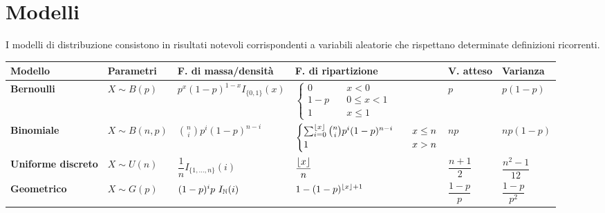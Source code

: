 \section{Modelli}
I modelli di distribuzione consistono in risultati notevoli corrispondenti a variabili aleatorie che rispettano determinate definizioni ricorrenti.

\begin{sidewaystable}
	\centering
	\begin{tabular}{llllll}
		\toprule
		\bfseries Modello           & \bfseries Parametri   & \bfseries F. di massa/densità                                    & \bfseries F. di ripartizione                                                                                          & \bfseries V. atteso & \bfseries Varianza    \\
		\midrule
		\bfseries Bernoulli         & $X\sim B(p)$          & $p^x(1-p)^{1-x}I_{\{0,1\}}(x)$                                   & $\begin{cases}0\quad & x<0\\1-p\quad & 0\leq x<1\\1\quad & x\leq 1\end{cases}$                                                                                           & $p$                 & $p(1-p)$              \\[5ex]
		\bfseries Binomiale         & $X\sim B(n,p)$        & $\displaystyle\binom{n}{i} p^i(1-p)^{n-i}$                       & $\begin{cases}\sum_{i=0}^{\left\lfloor x \right\rfloor}\binom{n}{i} p^i (1-p)^{n-i}\quad & x\leq n \\1 & x>n \end{cases}$                                                                                           & $np$                & $np(1-p)$             \\[3ex]
		\bfseries Uniforme discreto & $X\sim U(n)$          & $\dfrac{1}{n} I_{\{1,\dots,n\}}(i)$                              & $\dfrac{\left\lfloor x \right\rfloor}{n}$                                                                                                & $\dfrac{n+1}{2}$    & $\dfrac{n^2-1}{12}$   \\[2ex]
		\bfseries Geometrico        & $X\sim G(p)$          & $(1-p)^ip ~ I_\mathbb N (i)$                                            & $1 - (1-p)^{\left\lfloor x \right\rfloor+1}  $                                                                                           & $ \dfrac{1-p}{p}$   & $\dfrac{1-p}{p^2}$    \\[1ex]

\end{tabular}
\end{sidewaystable}

